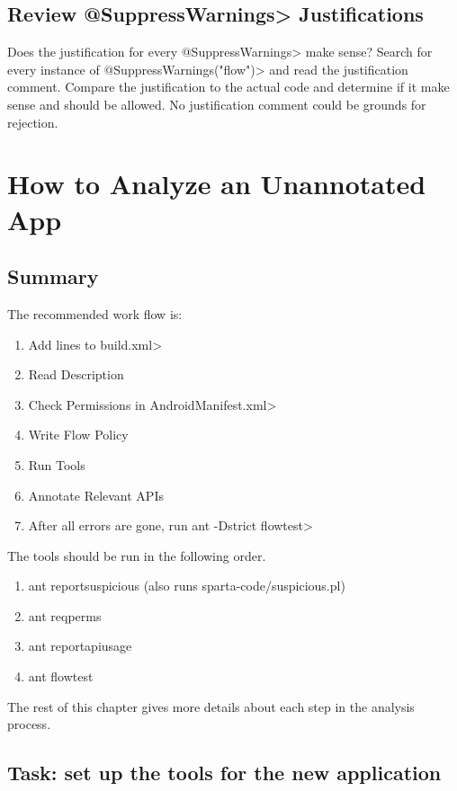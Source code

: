 \subsection{Review \<@SuppressWarnings> Justifications}
 Does the justification for every \<@SuppressWarnings> make sense? Search for every instance of 
 \<@SuppressWarnings("flow")> and read the justification comment.  Compare the justification to the
  actual code and determine if it make sense and should be allowed.  No justification comment 
  could be grounds for rejection.
  
\section{How to Analyze an Unannotated App\label{sec:analyzeunano}}

\subsection{Summary}

The recommended work flow is:  

\begin{enumerate}
\item Add lines to \<build.xml>
\item Read Description
\item Check Permissions in \<AndroidManifest.xml>
\item Write Flow Policy
\item Run Tools
\item Annotate Relevant APIs
\item After all errors are gone, run \<ant -Dstrict flowtest>
\end{enumerate}

\noindent 
The tools should be run in the following order. 

\begin{enumerate}
\item ant reportsuspicious (also runs sparta-code/suspicious.pl)
\item ant reqperms
\item ant reportapiusage
\item ant flowtest
\end{enumerate}

\noindent 
The rest of this chapter gives more details about each step in the analysis process.


\subsection{Task:  set up the tools for the new application}
\label{subsec:setupapp}

